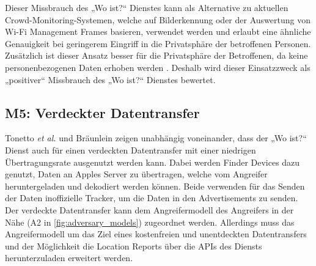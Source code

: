 Dieser Missbrauch des „Wo ist?“ Dienstes kann als Alternative zu aktuellen Crowd-Monitoring-Systemen, welche auf Bilderkennung oder der Auswertung von Wi-Fi Management Frames basieren, verwendet werden und erlaubt eine ähnliche Genauigkeit bei geringerem Eingriff in die Privatsphäre der betroffenen Personen.
Zusätzlich ist dieser Ansatz besser für die Privatsphäre der Betroffenen, da keine personenbezogenen Daten erhoben werden \cite{Tonetto_FindMy}.
Deshalb wird dieser Einsatzzweck als „positiver“ Missbrauch des „Wo ist?“ Dienstes bewertet.

\subsection[M5]{M5: Verdeckter Datentransfer}
\label{missbrauch:5}
Tonetto \textit{et al.} \cite{Tonetto_FindMy} und Bräunlein \cite{braeunlein_sendmy} zeigen unabhängig voneinander, dass der „Wo ist?“ Dienst auch für einen verdeckten Datentransfer mit einer niedrigen Übertragungsrate ausgenutzt werden kann.
Dabei werden Finder Devices dazu genutzt, Daten an Apples Server zu übertragen, welche vom Angreifer heruntergeladen und dekodiert werden können.
Beide verwenden für das Senden der Daten inoffizielle Tracker, um die Daten in den Advertisements zu senden.
Der verdeckte Datentransfer kann dem Angreifermodell des Angreifers in der Nähe (A2 in \autoref{fig:adversary_models}) zugeordnet werden.
Allerdings muss das Angreifermodell um das Ziel eines kostenfreien und unentdeckten Datentransfers und der Möglichkeit die Location Reports über die \acp{API} des Diensts herunterzuladen erweitert werden.


